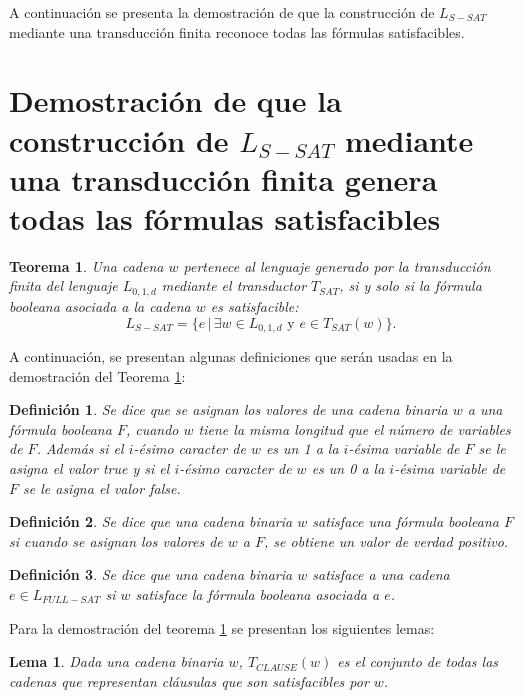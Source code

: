 \documentclass[12pt]{article}
\newtheorem{theorem}{Teorema}
\newtheorem{lemma}{Lema}
\newtheorem{definition}{Definición}
\newcommand{\true}{\textit{true}}
\newcommand{\false}{\textit{false}}
\begin{document}
A continuación se presenta la demostración de que la construcción de $L_{S-SAT}$ mediante una transducción finita reconoce todas las fórmulas satisfacibles.

\section{Demostración de que la construcción de $L_{S-SAT}$ mediante una transducción finita
  genera todas las fórmulas satisfacibles}

\begin{theorem}
    \label{teo:tsat}
    Una cadena $w$ pertenece al lenguaje generado por la transducción finita del lenguaje $L_{0,1,d}$
    mediante el transductor $T_{SAT}$, si y solo si la fórmula booleana asociada a la cadena $w$ es satisfacible:
    $$L_{S-SAT} = \{e\,|\,\exists w \in L_{0,1,d} \text{ y } e \in T_{SAT}(w) \}.$$
\end{theorem}

A continuación, se presentan algunas definiciones que serán usadas en la demostración del Teorema \ref{teo:tsat}:

\begin{definition}
    Se dice que se asignan los valores de una cadena binaria $w$ a una fórmula booleana $F$, cuando $w$ tiene la misma longitud
    que el número de variables de $F$. Además si el $i$-ésimo caracter de $w$ es un 1 a la $i$-ésima variable de $F$ se le asigna
    el valor \true{} y si el $i$-ésimo caracter de $w$ es un 0 a la $i$-ésima variable de $F$ se le asigna
    el valor \false{}.
\end{definition}

\begin{definition}
    Se dice que una cadena binaria $w$ satisface una fórmula booleana $F$ si cuando se asignan los valores de $w$ a $F$, se obtiene un valor de verdad positivo.
\end{definition}

\begin{definition}
    Se dice que una cadena binaria $w$ satisface a una cadena $e\in L_{FULL-SAT}$ si $w$ satisface la fórmula booleana asociada a $e$. 
\end{definition}

Para la demostración del teorema \ref{teo:tsat} se presentan los siguientes lemas:

\begin{lemma}
    \label{lem:clause}
    Dada una cadena binaria $w$, $T_{CLAUSE}(w)$ es el conjunto de todas las cadenas que representan cláusulas que son satisfacibles por $w$.
\end{lemma}
\end{document}

